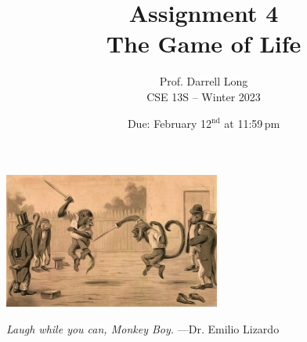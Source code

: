 \documentclass[11pt]{article}
\title{Assignment 4 \\ The Game of Life}
\author{Prof. Darrell Long \\ CSE 13S -- Winter 2023}
\date{Due: February 12$^\text{nd}$ at 11:59\,pm}
\begin{document}
\maketitle










\vspace{20pt}
\begin{center}
\includegraphics[height=1.75in]{images/monkey.jpg}
\vspace{10pt}

\emph{Laugh while you can, Monkey Boy.}
---Dr. Emilio Lizardo
\end{center}
\end{document}
